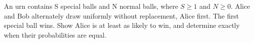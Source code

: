 An urn contains S special balls and N normal balls, where $S\ge 1$ and $N\ge 0$. Alice and Bob alternately draw uniformly without replacement, Alice first. The first special ball wins. Show Alice is at least as likely to win, and determine exactly when their probabilities are equal.
